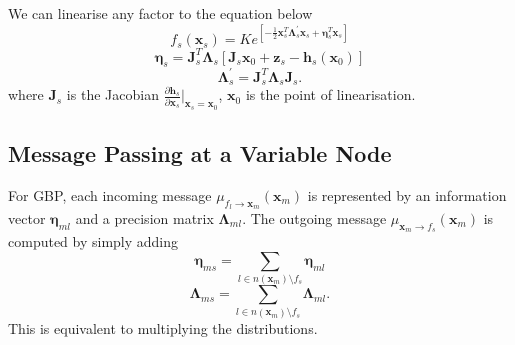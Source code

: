\documentclass[twocolumn]{article}
\begin{document}
We can linearise any factor to the equation below
\begin{equation}
    f_s(\textbf{x}_s) = Ke^{[-\frac{1}{2}\textbf{x}^{T}_{s} \boldsymbol{\Lambda}^{'}_s\textbf{x}_s + \boldsymbol{\eta}_s^T\textbf{x}_s]}
\end{equation}
\begin{equation}
    \boldsymbol{\eta}_s = \textbf{J}^T_s\boldsymbol{\Lambda}_s[\textbf{J}_s\textbf{x}_0 + \textbf{z}_s - \textbf{h}_s(\textbf{x}_0)]
\end{equation}
\begin{equation}
    \boldsymbol{\Lambda}^{'}_s = \textbf{J}_s^T\boldsymbol{\Lambda}_s\textbf{J}_s.
\end{equation}
where $\textbf{J}_s$ is the Jacobian $\frac{\partial \textbf{h}_s}{\partial \textbf{x}_s} \vert_{\textbf{x}_s = \textbf{x}_0}$, $\textbf{x}_0$ is the point of linearisation.

\subsection{Message Passing at a Variable Node}

For GBP, each incoming message $\mu_{f_l \rightarrow \textbf{x}_m}(\textbf{x}_m)$ is represented by an information vector $\boldsymbol{\eta}_{ml}$ and a precision matrix $\boldsymbol{\Lambda}_{ml}$.
The outgoing message $\mu_{\textbf{x}_m \rightarrow f_s }(\textbf{x}_m)$ is computed by simply adding 
\begin{equation}
    \boldsymbol{\eta}_{ms} = \sum_{l \in n(\textbf{x}_m) \setminus f_s}{\boldsymbol{\eta}_{ml}}
\end{equation}
\begin{equation}
    \boldsymbol{\Lambda}_{ms} = \sum_{l \in n(\textbf{x}_m) \setminus f_s}{\boldsymbol{\Lambda}_{ml}}.
\end{equation}
This is equivalent to multiplying the distributions.
\end{document}
